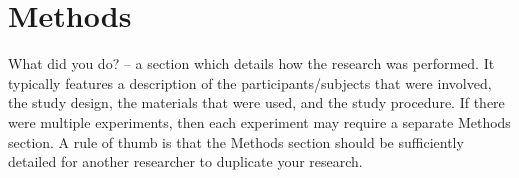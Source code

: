 \section{Methods}
What did you do? – a section which details how the research was performed.  It typically features a description of the participants/subjects that were involved, the study design, the materials that were used, and the study procedure.  If there were multiple experiments, then each experiment may require a separate Methods section.  A rule of thumb is that the Methods section should be sufficiently detailed for another researcher to duplicate your research.
